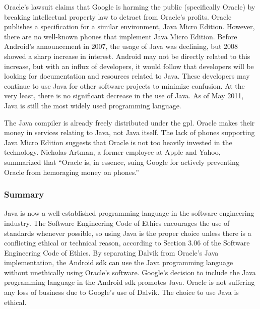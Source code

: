 \documentclass[11pt]{article}
\begin{document}
\begin{multicols}{2}
Oracle's lawsuit claims that Google is harming the public (specifically Oracle)
by breaking intellectual property law to detract from Oracle's profits.
\cite[Count VIII]{oracle-lawsuit} Oracle publishes a specification for a similar
environment, Java Micro Edition. \cite{java-me}  However, there are no
well-known phones that implement Java Micro Edition.  Before Android's
announcement in 2007, the usage of Java was declining, but 2008 showed a sharp
increase in interest.  \cite{tiobe-java}  Android may not be directly related to
this increase, but with an influx of developers, it would follow that developers
will be looking for documentation and resources related to Java.  These
developers may continue to use Java for other software projects to minimize
confusion.  At the very least, there is no significant decrease in the use of
Java.  As of May 2011, Java is still the most widely used programming language.
\cite{tiobe-java}

The Java compiler is already freely distributed under the \gls{gpl}.
\cite{openjdk-license}  Oracle makes their money in services relating to Java,
not Java itself.  The lack of phones supporting Java Micro Edition suggests that
Oracle is not too heavily invested in the technology.  Nicholas Artman, a former
employee at Apple and Yahoo, summarized that ``Oracle is, in essence, suing
Google for actively preventing Oracle from hemoraging money on phones.''
\cite{artman}


\subsubsection{Summary} %
\label{ssub:java-summary}

Java is now a well-established programming language in the software engineering
industry.  The Software Engineering Code of Ethics encourages the use of
standards whenever possible, so using Java is the proper choice unless there is
a conflicting ethical or technical reason, according to Section 3.06 of the
Software Engineering Code of Ethics. \cite[\S3.06]{secode}  By separating Dalvik
from Oracle's Java implementation, the Android \gls{sdk} can use the Java
programming language without unethically using Oracle's software.  Google's
decision to include the Java programming language in the Android \gls{sdk}
promotes Java.  Oracle is not suffering any loss of business due to Google's use
of Dalvik.  The choice to use Java is ethical.


\end{multicols}
\end{document}
